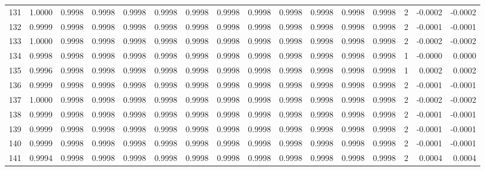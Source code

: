 \begin{tabular}{lrrrrrrrrrrrrrrr}
131 &      1.0000 &  0.9998 &  0.9998 &  0.9998 &  0.9998 &  0.9998 &  0.9998 &  0.9998 &  0.9998 &  0.9998 &   0.9998 &     0.9998 &      2 &                   -0.0002 &                    -0.0002 \\
132 &      0.9999 &  0.9998 &  0.9998 &  0.9998 &  0.9998 &  0.9998 &  0.9998 &  0.9998 &  0.9998 &  0.9998 &   0.9998 &     0.9998 &      2 &                   -0.0001 &                    -0.0001 \\
133 &      1.0000 &  0.9998 &  0.9998 &  0.9998 &  0.9998 &  0.9998 &  0.9998 &  0.9998 &  0.9998 &  0.9998 &   0.9998 &     0.9998 &      2 &                   -0.0002 &                    -0.0002 \\
134 &      0.9998 &  0.9998 &  0.9998 &  0.9998 &  0.9998 &  0.9998 &  0.9998 &  0.9998 &  0.9998 &  0.9998 &   0.9998 &     0.9998 &      1 &                   -0.0000 &                     0.0000 \\
135 &      0.9996 &  0.9998 &  0.9998 &  0.9998 &  0.9998 &  0.9998 &  0.9998 &  0.9998 &  0.9998 &  0.9998 &   0.9998 &     0.9998 &      1 &                    0.0002 &                     0.0002 \\
136 &      0.9999 &  0.9998 &  0.9998 &  0.9998 &  0.9998 &  0.9998 &  0.9998 &  0.9998 &  0.9998 &  0.9998 &   0.9998 &     0.9998 &      2 &                   -0.0001 &                    -0.0001 \\
137 &      1.0000 &  0.9998 &  0.9998 &  0.9998 &  0.9998 &  0.9998 &  0.9998 &  0.9998 &  0.9998 &  0.9998 &   0.9998 &     0.9998 &      2 &                   -0.0002 &                    -0.0002 \\
138 &      0.9999 &  0.9998 &  0.9998 &  0.9998 &  0.9998 &  0.9998 &  0.9998 &  0.9998 &  0.9998 &  0.9998 &   0.9998 &     0.9998 &      2 &                   -0.0001 &                    -0.0001 \\
139 &      0.9999 &  0.9998 &  0.9998 &  0.9998 &  0.9998 &  0.9998 &  0.9998 &  0.9998 &  0.9998 &  0.9998 &   0.9998 &     0.9998 &      2 &                   -0.0001 &                    -0.0001 \\
140 &      0.9999 &  0.9998 &  0.9998 &  0.9998 &  0.9998 &  0.9998 &  0.9998 &  0.9998 &  0.9998 &  0.9998 &   0.9998 &     0.9998 &      2 &                   -0.0001 &                    -0.0001 \\
141 &      0.9994 &  0.9998 &  0.9998 &  0.9998 &  0.9998 &  0.9998 &  0.9998 &  0.9998 &  0.9998 &  0.9998 &   0.9998 &     0.9998 &      2 &                    0.0004 &                     0.0004 \\

\end{tabular}
